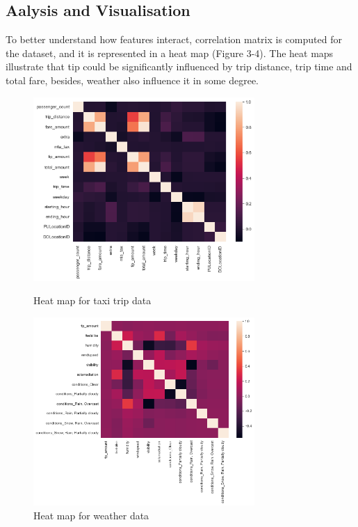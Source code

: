 \documentclass[11pt]{article}
\begin{document}
\subsection{Aalysis and Visualisation}

To better understand how features interact, correlation matrix is computed for the dataset, and it is represented in a heat map (Figure 3-4). The heat maps illustrate that tip could be significantly influenced by trip distance, trip time and total fare, besides, weather also influence it in some degree.


\begin{figure}[h]
\centering
\begin{minipage}[t]{0.48\textwidth}
\centering
    \includegraphics[width=0.75\textwidth]{plots/heatmap1.png}
    \caption{Heat map for taxi trip data}
\end{minipage}
\begin{minipage}[t]{0.48\textwidth}
\centering
    \includegraphics[width=0.75\textwidth]{plots/heatmap2.png}
    \caption{Heat map for weather data}
\end{minipage}
\end{figure}
\end{document}
